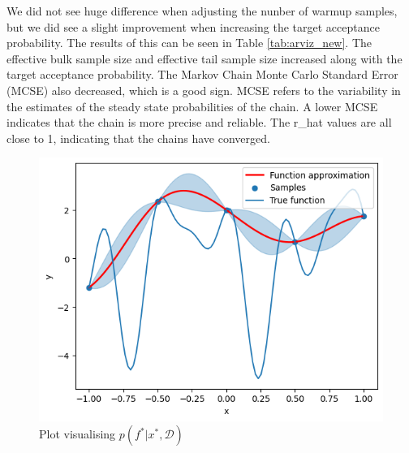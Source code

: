 We did not see huge difference when adjusting the nunber of warmup samples, but we did see a slight improvement when increasing the target acceptance probability. The results of this can be seen in Table \ref{tab:arviz_new}. The effective bulk sample size and effective tail sample size increased along with the target acceptance probability. The Markov Chain Monte Carlo Standard Error (MCSE) also decreased, which is a good sign. MCSE refers to the variability in the estimates of the steady state probabilities of the chain. A lower MCSE indicates that the chain is more precise and reliable. The r\_hat values are all close to 1, indicating that the chains have converged. 

\begin{figure}[h]
\centering
\includegraphics[width=0.5\linewidth]{images/f_star.png}
\setlength{\belowcaptionskip}{-10pt}
\caption{Plot visualising $p(f^*|x^*, \mathcal{D})$}
\label{fig:f_star}
\end{figure}
